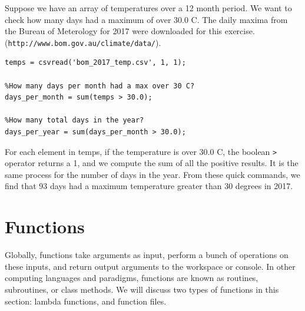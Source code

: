 \documentclass[12pt]{article}
\begin{document}
Suppose we have an array of temperatures over a 12 month period. We want to check how many days had a maximum of over 30.0 C. The daily maxima from the Bureau of Meterology for 2017 were downloaded for this exercise. \\ (\texttt{http://www.bom.gov.au/climate/data/}). \\


\begin{lstlisting}
temps = csvread('bom_2017_temp.csv', 1, 1);

%How many days per month had a max over 30 C?
days_per_month = sum(temps > 30.0);

%How many total days in the year?
days_per_year = sum(days_per_month > 30.0);
\end{lstlisting}

For each element in temps, if the temperature is over 30.0 C, the boolean \texttt{>} operator returns a 1, and we compute the sum of all the positive results. It is the same process for the number of days in the year. From these quick commands, we find that 93 days had a maximum temperature greater than 30 degrees in 2017.

\newpage
\section{Functions}
\label{sec:functions}
Globally, functions take arguments as input, perform a bunch of operations on these inputs, and return output arguments to the workspace or console. In other computing languages and paradigms, functions are known as routines, subroutines, or class methods. We will discuss two types of functions in this section: lambda functions, and function files. 
\end{document}
